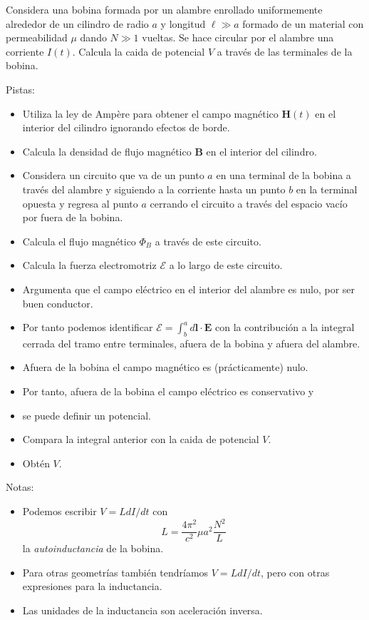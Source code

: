 \documentclass{exam}
\begin{document}
\begin{questions}
  \question \label{l:b} Considera una bobina formada por un alambre enrollado
  uniformemente alrededor de un cilindro de radio $a$ y longitud $\ell\gg
  a$ formado de un material con permeabilidad $\mu$ dando $N\gg 1$
  vueltas. Se hace circular por el alambre una corriente
  $I(t)$. Calcula la caida de potencial $V$ a través de las terminales
  de la bobina.

  Pistas:
  \begin{itemize}
  \item Utiliza la ley de Ampère para obtener el campo magnético $\bm H(t)$ en el
    interior del cilindro ignorando efectos de borde.
  \item Calcula la densidad de flujo magnético $\bm B$ en el interior
    del cilindro.
  \item Considera un circuito que va de un punto $a$ en una terminal
    de la bobina a través del alambre y siguiendo a la corriente hasta
    un punto $b$ en la terminal opuesta y regresa al punto $a$
    cerrando el circuito a través del espacio vacío por fuera de la
    bobina.
  \item Calcula el flujo magnético $\Phi_B$ a través de este
    circuito.
  \item Calcula la fuerza electromotriz $\mathcal E$ a lo largo de este circuito.
  \item Argumenta que el campo eléctrico en el interior del alambre es
    nulo, por ser buen conductor.
  \item Por tanto podemos identificar $\mathcal E=\int_b^a d\bm
    l\cdot\bm E$ con la contribución a la integral cerrada del tramo
    entre terminales, afuera de la bobina y afuera del
    alambre.
  \item Afuera de la bobina el campo magnético es (prácticamente)
    nulo.
  \item Por tanto, afuera de la bobina el campo eléctrico es
    conservativo y
  \item se puede definir un potencial.
  \item Compara la integral anterior con la caida de potencial $V$.
  \item Obtén $V$.
  \end{itemize}
  Notas:
  \begin{itemize}
  \item Podemos escribir $V=L d I/dt$ con
    $$
    L=\frac{4\pi^2}{c^2} \mu a^2\frac{N^2}{L}
    $$
    la {\em autoinductancia} de la bobina.
  \item Para otras geometrías también tendríamos $V=L d I/dt$, pero
    con otras expresiones para la inductancia.
  \item Las unidades de la inductancia son aceleración inversa.
  \end{itemize}



\end{questions}
\end{document}
